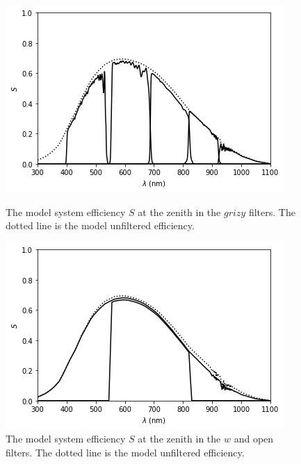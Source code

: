 \begin{figure}
\begin{center}
\includegraphics[width=0.9\linewidth]{figures/huitzi-S-grizy.png}
\medskip
\caption{The model system efficiency $S$ at the zenith in the $grizy$ filters. The dotted line is the model unfiltered efficiency.}
\label{figure:huitzi-S-first}
\end{center}
\medskip
\begin{center}
\includegraphics[width=0.9\linewidth]{figures/huitzi-S-w-open.png}
\medskip
\caption{The model system efficiency $S$ at the zenith in the $w$ and open filters. The dotted line is the model unfiltered efficiency.}
\end{center}
\end{figure}

